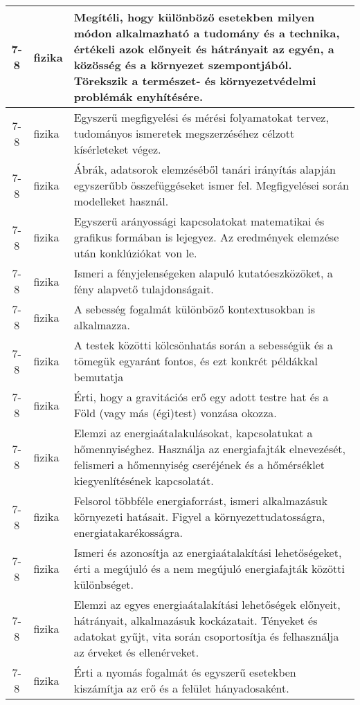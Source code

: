 \begin{small}
\begin{longtable}{c | p{2cm} |  p{11cm} }
              7-8 & fizika & Megítéli, hogy különböző esetekben milyen módon alkalmazható a tudomány és a technika, értékeli azok előnyeit és hátrányait az egyén, a közösség és a környezet szempontjából. Törekszik a természet- és környezetvédelmi problémák enyhítésére. \\ \hline
              7-8 & fizika & Egyszerű megfigyelési és mérési folyamatokat tervez, tudományos ismeretek megszerzéséhez célzott kísérleteket végez. \\ \hline
              7-8 & fizika & Ábrák, adatsorok elemzéséből tanári irányítás alapján egyszerűbb összefüggéseket ismer fel. Megfigyelései során modelleket használ.  \\ \hline
              7-8 & fizika & Egyszerű arányossági kapcsolatokat matematikai és grafikus formában is lejegyez. Az eredmények elemzése után konklúziókat von le. \\ \hline
              7-8 & fizika & Ismeri a fényjelenségeken alapuló kutatóeszközöket, a fény alapvető tulajdonságait. \\ \hline
              7-8 & fizika & A sebesség fogalmát különböző kontextusokban is alkalmazza. \\ \hline
              7-8 & fizika & A testek közötti kölcsönhatás során a sebességük és a tömegük egyaránt fontos, és ezt konkrét példákkal bemutatja \\ \hline
              7-8 & fizika & Érti, hogy a gravitációs erő egy adott testre hat és a Föld (vagy más (égi)test) vonzása okozza. \\ \hline
              7-8 & fizika & Elemzi az energiaátalakulásokat, kapcsolatukat a hőmennyiséghez. Használja az energiafajták elnevezését, felismeri a hőmennyiség cseréjének és a hőmérséklet kiegyenlítésének kapcsolatát. \\ \hline
              7-8 & fizika & Felsorol többféle energiaforrást, ismeri alkalmazásuk környezeti hatásait. Figyel a környezettudatosságra, energiatakarékosságra. \\ \hline
              7-8 & fizika & Ismeri és azonosítja az energiaátalakítási lehetőségeket, érti a megújuló és a nem megújuló energiafajták közötti különbséget. \\ \hline
              7-8 & fizika & Elemzi az egyes energiaátalakítási lehetőségek előnyeit, hátrányait, alkalmazásuk kockázatait. Tényeket és adatokat gyűjt, vita során csoportosítja és felhasználja az érveket és ellenérveket. \\ \hline
              7-8 & fizika & Érti a nyomás fogalmát és egyszerű esetekben kiszámítja az erő és a felület hányadosaként. \\ \hline

\end{longtable}
\end{small}
